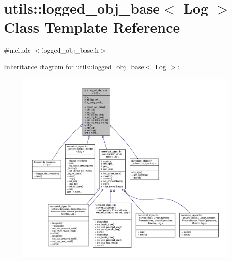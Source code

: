\hypertarget{classutils_1_1logged__obj__base}{\section{utils\-:\-:logged\-\_\-obj\-\_\-base$<$ Log $>$ Class Template Reference}
\label{classutils_1_1logged__obj__base}
}


{\ttfamily \#include $<$logged\-\_\-obj\-\_\-base.\-h$>$}



Inheritance diagram for utils\-:\-:logged\-\_\-obj\-\_\-base$<$ Log $>$\-:\nopagebreak
\begin{figure}[H]
\begin{center}
\leavevmode
\includegraphics[width=350pt]{classutils_1_1logged__obj__base__inherit__graph}
\end{center}
\end{figure}


